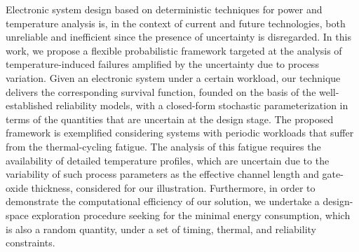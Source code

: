 Electronic system design based on deterministic techniques for power and temperature analysis is, in the context of current and future technologies, both unreliable and inefficient since the presence of uncertainty is disregarded.
In this work, we propose a flexible probabilistic framework targeted at the analysis of temperature-induced failures amplified by the uncertainty due to process variation.
Given an electronic system under a certain workload, our technique delivers the corresponding survival function, founded on the basis of the well-established reliability models, with a closed-form stochastic parameterization in terms of the quantities that are uncertain at the design stage.
The proposed framework is exemplified considering systems with periodic workloads that suffer from the thermal-cycling fatigue.
The analysis of this fatigue requires the availability of detailed temperature profiles, which are uncertain due to the variability of such process parameters as the effective channel length and gate-oxide thickness, considered for our illustration.
Furthermore, in order to demonstrate the computational efficiency of our solution, we undertake a design-space exploration procedure seeking for the minimal energy consumption, which is also a random quantity, under a set of timing, thermal, and reliability constraints.
